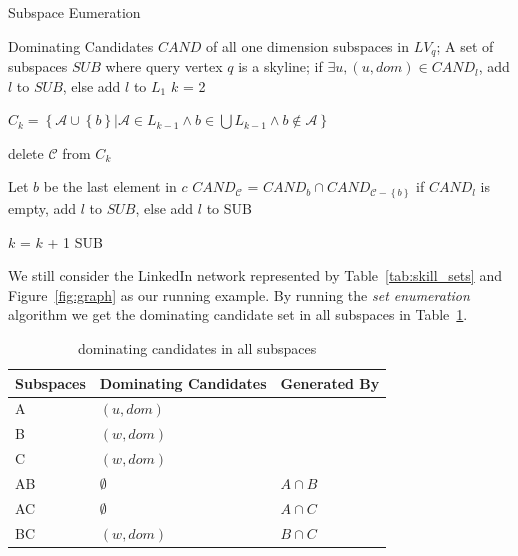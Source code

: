 \begin{algorithm}[H]
  \caption{Subspace Eumeration}\label{algo:blah}
    \begin{algorithmic}[1]
  \show\LOOP
    \REQUIRE Dominating Candidates $\mathit{CAND}$ of all one dimension subspaces in $LV_q$;
    \ENSURE A set of subspaces $SUB$ where query vertex $q$ is a skyline;
            \STATE if $\exists u, (u, dom)\in \mathit{CAND}_l$, add $l$ to $SUB$, else add $l$ to $L_1$
        \ENDFOR
        \STATE $k$ = 2
        
        
            \STATE $C_k = \left\{\mathcal{A} \cup \left\{b\right\} | \mathcal{A} \in L_{k-1} \wedge b \in \bigcup L_{k-1} \wedge b \notin \mathcal{A} \right\}$
            
                        \STATE delete $\mathcal{C}$ from $C_k$
                        
                    \ENDIF
                \ENDFOR
            \ENDFOR
            
                \STATE Let $b$ be the last element in $c$
                \STATE $CAND_\mathcal{C}$ = $CAND_b \cap CAND_{\mathcal{C}-\left\{b\right\}}$
                \STATE if $CAND_l$ is empty, add $l$ to $SUB$, else add $l$ to SUB
            \ENDFOR
            
            \STATE $k$ = $k$ + 1
        \ENDWHILE
        \RETURN SUB
  \end{algorithmic}
\end{algorithm}

We still consider the LinkedIn network represented by Table~\ref{tab:skill_sets} and Figure~\ref{fig:graph} as our running example. By running the \emph{set enumeration} algorithm we get the dominating candidate set in all subspaces in Table~\ref{tab:sub_dom_cand_pruned}.

\begin{table}[H]
    \centering
    \begin{tabular}{|l|l|l|}
    \hline
    Subspaces & Dominating Candidates & Generated By \\ \hline
    A         & $(u, dom)$  &              \\ \hline
    B         & $(w, dom)$  &              \\ \hline
    C         & $(w, dom)$  &              \\ \hline
    AB        & $\emptyset$           & $A \cap B$   \\ \hline
    AC        & $\emptyset$           & $A \cap C$   \\ \hline
    BC        & $(w, dom)$            & $B \cap C$   \\ \hline
    \end{tabular}
    \caption{\label{font-table} dominating candidates in all subspaces}
    \label{tab:sub_dom_cand_pruned}
\end{table}

